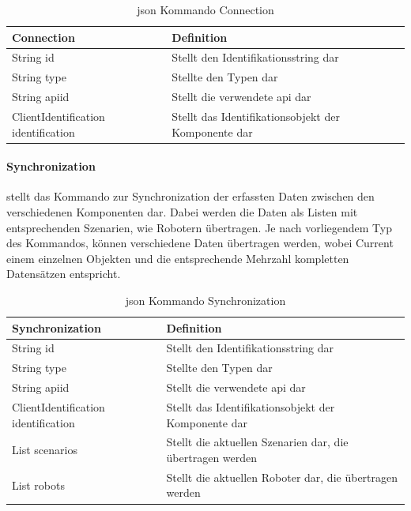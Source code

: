 \begin{table}[h]
	\centering
	\begin{tabular}{|p{4cm}|p{8cm}|}
		\hline
		\textbf{Connection} & Definition\\
		\hline
		String id & Stellt den Identifikationsstring dar \\
		String type & Stellte den Typen dar \\
		String apiid & Stellt die verwendete \gls{api} dar \\
		ClientIdentification identification & Stellt das Identifikationsobjekt der Komponente dar \\
		\hline
	\end{tabular}
	\caption[\gls{json} Kommando Connection]{\gls{json} Kommando Connection}
	\label{tab:Connection}
\end{table}

\paragraph{Synchronization} stellt das Kommando zur Synchronization der erfassten Daten zwischen den verschiedenen Komponenten dar. Dabei werden die Daten als Listen mit entsprechenden Szenarien, wie Robotern übertragen. Je nach vorliegendem Typ des Kommandos, können verschiedene Daten übertragen werden, wobei Current einem einzelnen Objekten und die entsprechende Mehrzahl kompletten Datensätzen entspricht.

\begin{table}[h]
	\centering
	\begin{tabular}{|p{4cm}|p{10cm}|}
		\hline
		\textbf{Synchronization} & Definition\\
		\hline
		String id & Stellt den Identifikationsstring dar \\
		String type & Stellte den Typen dar \\
		String apiid & Stellt die verwendete \gls{api} dar \\
		ClientIdentification identification & Stellt das Identifikationsobjekt der Komponente dar \\
		List scenarios & Stellt die aktuellen Szenarien dar, die übertragen werden\\
		List robots & Stellt die aktuellen Roboter dar, die übertragen werden \\
		\hline
	\end{tabular}
	\caption[\gls{json} Kommando Synchronization]{\gls{json} Kommando Synchronization}
	\label{tab:Synchronization}
\end{table}

